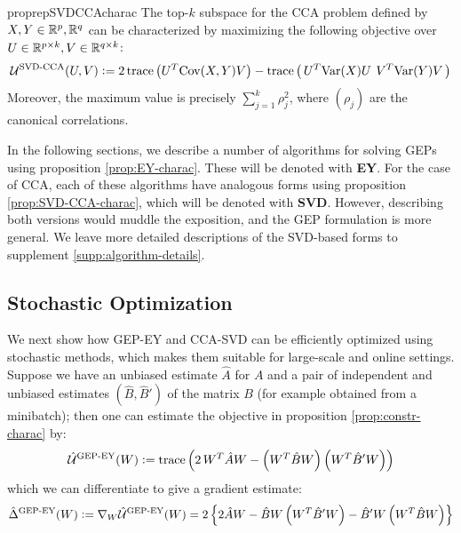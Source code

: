 \begin{restatable}{proprep}{SVDCCAcharac}
    \label{prop:SVD-CCA-charac}
    The top-$k$ subspace for the CCA problem defined by $X,Y \in \mathbb{R}^p,\mathbb{R}^q$ can be characterized by maximizing the following objective over $U \in \mathbb{R}^{p \times k}, V \in \mathbb{R}^{q \times k}$:
    \begin{align}\label{eq:EY-charac}
        \mathcal{U}^\text{SVD-CCA}(U,V)
        \vcentcolon= 2 \operatorname{trace}\left({U}^T \mathrm{Cov}(X,Y) {V} \right) - \operatorname{trace}\left(\, {U}^T \mathrm{Var}(X) {U} \:\, {V}^T \mathrm{Var}(Y) {V} \,\right)
    \end{align}
    Moreover, the maximum value is precisely $\sum_{j=1}^k \rho_j^2$, where $(\rho_j)$ are the canonical correlations.
\end{restatable}

In the following sections, we describe a number of algorithms for solving GEPs using proposition \ref{prop:EY-charac}.
These will be denoted with \textbf{EY}. For the case of CCA, each of these algorithms have analogous forms using proposition \ref{prop:SVD-CCA-charac}, which will be denoted with \textbf{SVD}. However, describing both versions would muddle the exposition, and the GEP formulation is more general. We leave more detailed descriptions of the SVD-based forms to supplement \ref{supp:algorithm-details}.

\subsection{Stochastic Optimization}

We next show how GEP-EY and CCA-SVD can be efficiently optimized using stochastic methods, which makes them suitable for large-scale and online settings.
Suppose we have an unbiased estimate $\hat{A}$ for $A$ and a pair of independent and unbiased estimates $(\hat{B},\hat{B}')$ of the matrix $B$ (for example obtained from a minibatch); then one can estimate the objective in proposition \ref{prop:constr-charac} by:
\begin{align}
    \hat{\mathcal{U}}^\text{GEP-EY}(W) \vcentcolon= \operatorname{trace} \left( 2\, W^T \hat{A} W - \left(W^T \hat{B} W\right) \left(W^T \hat{B}' W\right) \right)
\end{align}
which we can differentiate to give a gradient estimate:
\begin{align}\label{eq:GEP-EY-grad}
    \hat{\Delta}^{\text{GEP-EY}}(W)
    \vcentcolon= \nabla_W \hat{\mathcal{U}}^\text{GEP-EY}(W)
    = 2 \left\{ 2 \hat{A} W - \hat{B} W \left(W^T \hat{B}' W \right) - \hat{B}' W \left(W^T \hat{B} W \right) \right\}
\end{align}

